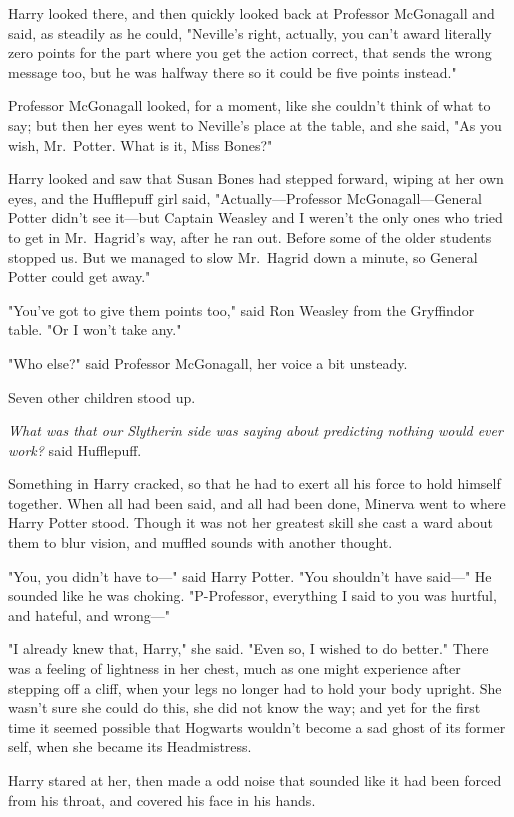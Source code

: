 Harry looked there, and then quickly looked back at Professor McGonagall and
said, as steadily as he could, "Neville's right, actually, you can't award
literally zero points for the part where you get the action correct, that sends
the wrong message too, but he was halfway there so it could be five points
instead."

Professor McGonagall looked, for a moment, like she couldn't think of what to
say; but then her eyes went to Neville's place at the table, and she said, "As
you wish, Mr.~Potter. What is it, Miss Bones?"

Harry looked and saw that Susan Bones had stepped forward, wiping at her own
eyes, and the Hufflepuff girl said, "Actually---Professor McGonagall---General
Potter didn't see it---but Captain Weasley and I weren't the only ones who
tried to get in Mr.~Hagrid's way, after he ran out. Before some of the older
students stopped us. But we managed to slow Mr.~Hagrid down a minute, so
General Potter could get away."

"You've got to give them points too," said Ron Weasley from the Gryffindor
table. "Or I won't take any."

"Who else?" said Professor McGonagall, her voice a bit unsteady.

Seven other children stood up.

\emph{What was that our Slytherin side was saying about predicting nothing
would ever work?} said Hufflepuff.

Something in Harry cracked, so that he had to exert all his force to hold
himself together.
\later
When all had been said, and all had been done, Minerva went to where Harry
Potter stood. Though it was not her greatest skill she cast a ward about them
to blur vision, and muffled sounds with another thought.

"You, you didn't have to---" said Harry Potter. "You shouldn't have said---" He
sounded like he was choking. "P-Professor, everything I said to you was
hurtful, and hateful, and wrong---"

"I already knew that, Harry," she said. "Even so, I wished to do better." There
was a feeling of lightness in her chest, much as one might experience after
stepping off a cliff, when your legs no longer had to hold your body upright.
She wasn't sure she could do this, she did not know the way; and yet for the
first time it seemed possible that Hogwarts wouldn't become a sad ghost of its
former self, when she became its Headmistress.

Harry stared at her, then made a odd noise that sounded like it had been forced
from his throat, and covered his face in his hands.

